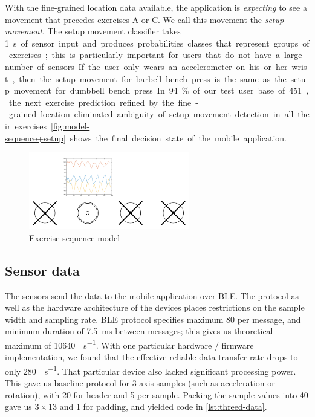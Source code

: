 \documentclass[a4paper, 10 pt, conference]{IEEEtran}
\begin{document}
With the fine-grained location data available, the application is \emph{expecting} to see a movement that precedes exercises A or C. We call this movement the \emph{setup movement}. The setup movement classifier takes \SI{1}\second of sensor input and produces probabilities classes that represent groups of exercises; this is particularly important for users that do not have a large number of sensors. If the user only wears an accelerometer on his or her wrist, then the setup movement for barbell bench press is the same as the setup movement for dumbbell bench press. In 94 \% of our test user base of 451, the next exercise prediction refined by the fine-grained location eliminated ambiguity of setup movement detection in all their exercises. \autoref{fig:model-sequence+setup} shows the final decision state of the mobile application.

\begin{figure}[hb]
	\begin{center}
		\caption{Exercise sequence model}
		\label{fig:model-sequence+setup}
		\includegraphics[width=7cm,keepaspectratio]{ri-model-sequence+setup.png}
	\end{center}
\end{figure}

\subsection{Sensor data}

The sensors send the data to the mobile application over BLE. The protocol as well as the hardware architecture of the devices places restrictions on the sample width and sampling rate. BLE protocol specifies maximum \SI{80}{\byte} per message, and minimum duration of \SI{7.5}{\milli\second} between messages; this gives us theoretical maximum of \SI{10640}{\byte\per\second}. With one particular hardware / firmware implementation, we found that the effective reliable data transfer rate drops to only \SI{280}{\byte\per\second}. That particular device also lacked significant processing power. This gave us baseline protocol for 3-axis samples (such as acceleration or rotation), with \SI{20}{\byte} for header and \SI{5}{\byte} per sample. Packing the sample values into \SI{40}{\bit} gave us $3 \times$\SI{13}{\bit} and \SI{1}{\bit} for padding, and yielded code in \autoref{lst:threed-data}.
\end{document}
